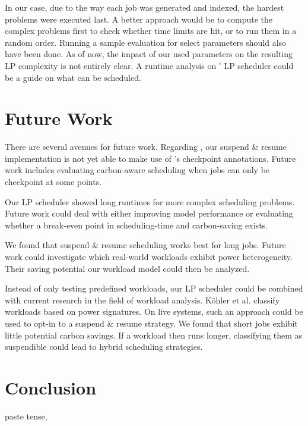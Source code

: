 In our case, due to the way each job was generated and indexed, the hardest problems were executed last. 
A better approach would be to compute the complex problems first to check whether time limits are hit, or to run them in a random order.
Running a sample evaluation for select parameters should also have been done.
As of now, the impact of our used parameters on the resulting LP complexity is not entirely clear.
A runtime analysis on \programname{}' LP scheduler could be a guide on what can be scheduled.

\section{Future Work} \label{sec:future_work}

There are several avenues for future work.
Regarding \programname{}, our suspend \& resume implementation is not yet able to make use of \modelname{}'s checkpoint annotations. Future work includes evaluating carbon-aware scheduling when jobs can only be checkpoint at some points.

Our LP scheduler showed long runtimes for more complex scheduling problems.
Future work could deal with either improving model performance  or evaluating whether a break-even point in scheduling-time and carbon-saving exists.

We found that suspend \& resume scheduling works best for long jobs.
Future work could investigate which real-world workloads exhibit power heterogeneity.
Their saving potential our workload model could then be analyzed.

Instead of only testing predefined workloads, our LP scheduler could be combined with current research in the field of workload analysis. 
Köhler et al. \cite{kohler_recognizing_2021} classify workloads based on power signatures. 
On live systems, such an approach could be used to opt-in to a suspend \& resume strategy. 
We found that short jobs exhibit little potential carbon savings. 
If a workload then runs longer, classifying them as suspendible could lead to hybrid scheduling strategies.  

\section{Conclusion}

paste tense, 